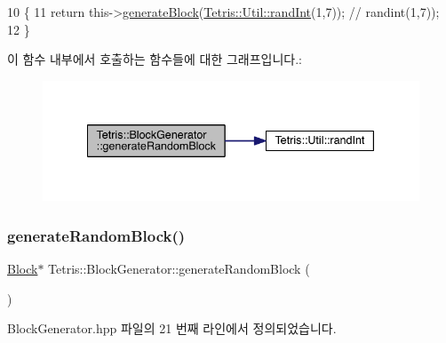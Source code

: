 \begin{DoxyCode}
10                                                   \{
11             \textcolor{keywordflow}{return} this->\hyperlink{class_tetris_1_1_block_generator_a581b22cebe170d3fe8b51130c01e7a22}{generateBlock}(\hyperlink{namespace_tetris_1_1_util_aa590e9fd847ac6e0c9bc6bf464b5a74b}{Tetris::Util::randInt}(1,7)); \textcolor{comment}{//
      randint(1,7));}
12             \}
\end{DoxyCode}
이 함수 내부에서 호출하는 함수들에 대한 그래프입니다.\+:
\nopagebreak
\begin{figure}[H]
\begin{center}
\leavevmode
\includegraphics[width=338pt]{d3/d50/class_tetris_1_1_block_generator_a10dfe1467d40437ad41c5ae76437ad78_cgraph}
\end{center}
\end{figure}
\mbox{\label{class_tetris_1_1_block_generator_a434df5baf3944a534492b63763b532a6}} 
\subsubsection{\texorpdfstring{generate\+Random\+Block()}{generateRandomBlock()}\hspace{0.1cm}{\footnotesize\ttfamily [2/2]}}
{\footnotesize\ttfamily \hyperlink{class_tetris_1_1_block}{Block}$\ast$ Tetris\+::\+Block\+Generator\+::generate\+Random\+Block (\begin{DoxyParamCaption}{ }\end{DoxyParamCaption})\hspace{0.3cm}{\ttfamily [inline]}}



Block\+Generator.\+hpp 파일의 21 번째 라인에서 정의되었습니다.


